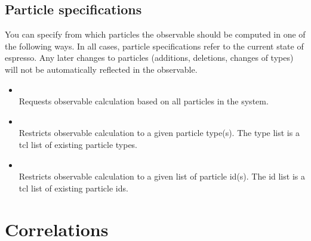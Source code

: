 \subsection{Particle specifications}
\label{sec:PartSpec}
You can specify from which particles the observable should be computed in one of 
the following ways. In all cases, particle specifications refer to the current
state of espresso. Any later changes to particles (additions, deletions, changes
of types) will not be automatically reflected in the observable.
  \begin{itemize}
    \item {} \\
          Requests observable calculation based on all particles in the system.
    \item {}  \\
          Restricts observable calculation to a given particle type(s). The type
	  list is a tcl list of existing particle types.
    \item {}  \\
          Restricts observable calculation to a given list of particle id(s). The id 
	  list is a tcl list of existing particle ids.
  \end{itemize}



\section{Correlations}
\label{sec:Correlations}

